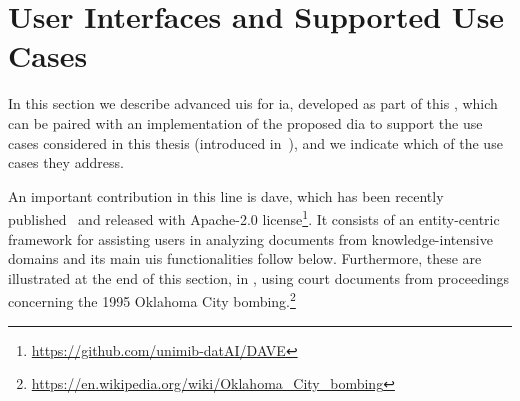 \section[User Interfaces and Supported Use Cases][User Interfaces]{User Interfaces and Supported Use Cases}
\label{sec:iaui-from-prototypes}

In this section we describe advanced \acfp{ui} for \acl{ia}, developed as part of this \phd, which can be paired with an implementation of the proposed \ac{dia} to support the use cases considered in this thesis (introduced in~), and we indicate which of the use cases they address.


An important contribution in this line is \acf{dave}, which has been recently
published~\cite{Agazzi2025DAVE} and released with Apache-2.0
license\footnote{\url{https://github.com/unimib-datAI/DAVE}}. It consists of an
entity-centric framework for assisting users in analyzing documents from
knowledge-intensive domains and its main \acp{ui} functionalities follow below. Furthermore, these are illustrated at the end of this section, in , using court documents from proceedings concerning the 1995 Oklahoma City bombing.\footnote{\url{https://en.wikipedia.org/wiki/Oklahoma_City_bombing}}

